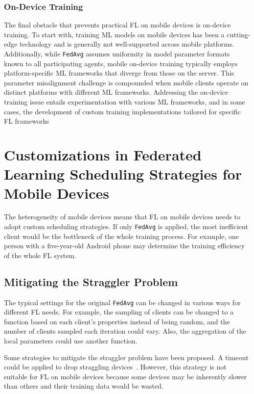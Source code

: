 \documentclass[conference]{IEEEtran}
\begin{document}
\subsubsection{On-Device Training}

The final obstacle that prevents practical FL on mobile devices is
on-device training.
To start with, training ML models on mobile devices has been
a cutting-edge technology and
is generally not well-supported across mobile platforms.
Additionally,
while \verb|FedAvg| assumes uniformity in model parameter formats known to
all participating agents,
mobile on-device training typically employs platform-specific ML frameworks
that diverge from those on the server.
This parameter misalignment challenge is compounded when
mobile clients operate on distinct platforms with
different ML frameworks.
Addressing the on-device training issue entails
experimentation with various ML frameworks,
and in some cases,
the development of custom training implementations tailored for
specific FL frameworks

\section{Customizations in Federated Learning Scheduling Strategies for
    Mobile Devices
}

\label{sec:scheduling}

The heterogeneity of mobile devices means that FL on mobile devices needs to
adopt custom scheduling strategies.
If only \verb|FedAvg| is applied,
the most inefficient client would be the bottleneck of
the whole training process.
For example, one person with a five-year-old Android phone may determine
the training efficiency of the whole FL system.

\subsection{Mitigating the Straggler Problem}

The typical settings for the original \verb|FedAvg| can be changed in
various ways for different FL needs.
For example,
the sampling of clients can be changed to a function based on
each client's properties instead of being random,
and the number of clients sampled each iteration could vary.
Also, the aggregation of the local parameters could use another function.

Some strategies to mitigate the straggler problem have been proposed.
A timeout could be applied to drop
straggling devices~\cite{bonawitz2019towards}.
However, this strategy is not suitable for FL on mobile devices because
some devices may be inherently slower than others and
their training data would be wasted.
\end{document}
